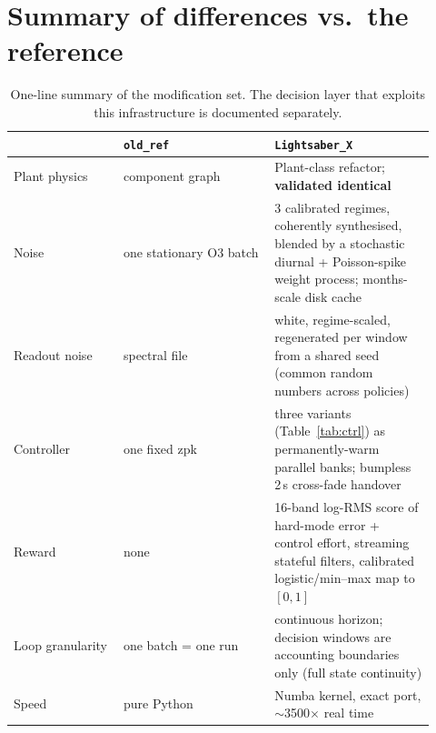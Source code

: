 \documentclass[11pt,a4paper]{article}
\newcommand{\code}[1]{\texttt{#1}}
\begin{document}
\section{Summary of differences vs.\ the reference}

\begin{table}[h]
\centering
\small
\begin{tabular}{p{0.24\linewidth}p{0.33\linewidth}p{0.35\linewidth}}
\toprule
 & \code{old\_ref} & \code{Lightsaber\_X}\\
\midrule
Plant physics & component graph & Plant-class refactor; \textbf{validated identical}\\
Noise & one stationary O3 batch & 3 calibrated regimes, coherently synthesised, blended by a stochastic diurnal + Poisson-spike weight process; months-scale disk cache\\
Readout noise & spectral file & white, regime-scaled, regenerated per window from a shared seed (common random numbers across policies)\\
Controller & one fixed zpk & three variants (Table~\ref{tab:ctrl}) as permanently-warm parallel banks; bumpless 2\,s cross-fade handover\\
Reward & none & 16-band log-RMS score of hard-mode error + control effort, streaming stateful filters, calibrated logistic/min--max map to $[0,1]$\\
Loop granularity & one batch = one run & continuous horizon; decision windows are accounting boundaries only (full state continuity)\\
Speed & pure Python & Numba kernel, exact port, $\sim$3500$\times$ real time\\
\bottomrule
\end{tabular}
\caption{One-line summary of the modification set. The decision layer that exploits this
infrastructure is documented separately.}
\end{table}
\end{document}
